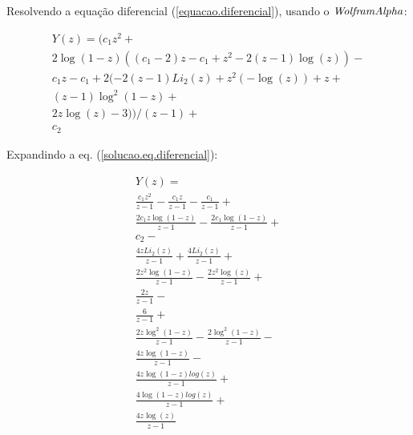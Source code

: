 \documentclass[a4paper,10pt]{article}
\begin{document}
Resolvendo a equação diferencial (\ref{equacao.diferencial}), usando o $\it{Wolfram Alpha}$:

\begin{equation}
\begin{array}{lcl} 
Y(z) = (c_1 z^2+ \\
2 \log(1-z) ((c_1-2) z-c_1+z^2-2 (z-1) \log(z))-\\
c_1 z-c_1+2 (-2 (z-1) Li_2(z)+z^2 (-\log(z))+z+\\
(z-1) \log^2(1-z)+\\
2 z \log(z)-3))/(z-1)+\\
c_2
\end{array}  
\label{solucao.eq.diferencial}
\end{equation}

Expandindo a eq. (\ref{solucao.eq.diferencial}):

\begin{equation}
\begin{array}{lcl} 
 Y(z) = \\
 \displaystyle \frac{c_1 z^2}{z-1}-\displaystyle \frac{c_1 z}{z-1}- \displaystyle \frac{c_1}{z-1}+\\
 \displaystyle \frac{2 c_1 z \log(1-z)}{z-1}-\displaystyle \frac{2 c_1 \log(1-z)}{z-1}+\\
 c_2-\\
 \displaystyle \frac{4 z Li_2(z)}{z-1}+\displaystyle \frac{4 Li_2(z)}{z-1}+\\
 \displaystyle \frac{2 z^2 \log(1-z)}{z-1}-\displaystyle \frac{2 z^2 \log(z)}{z-1}+\\
 \displaystyle \frac{2 z}{z-1}-\\
 \displaystyle \frac{6}{z-1}+\\
 \displaystyle \frac{2 z \log^2(1-z)}{z-1}-\displaystyle \frac{2 \log^2(1-z)}{z-1}-\\
 \displaystyle \frac{4 z \log(1-z)}{z-1}-\\
 \displaystyle \frac{4 z \log(1-z) log(z)}{z-1}+\\
 \displaystyle \frac{4 \log(1-z) log(z)}{z-1} + \\
  \displaystyle \frac{4 z \log(z)}{z-1}
\end{array}
\end{equation}
\end{document}
